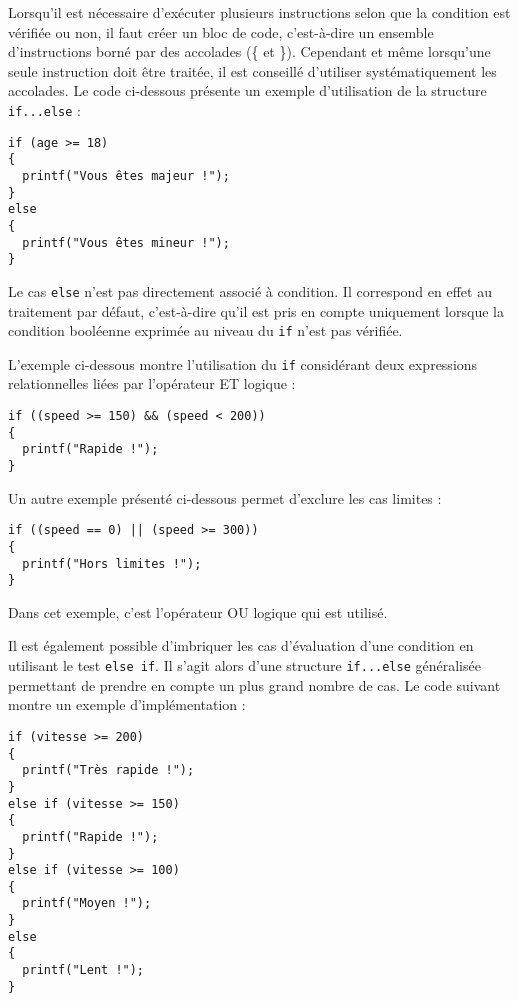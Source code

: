 \documentclass[DIV=calc,paper=a4,fontsize=11pt,twocolumn,halfparskip,parindent]{scrartcl} %
\begin{document}
Lorsqu’il est nécessaire d’exécuter plusieurs instructions selon que la condition est vérifiée ou non, il faut créer un bloc de code, c’est-à-dire un ensemble
d’instructions borné par des accolades (\{ et \}). Cependant et même lorsqu'une seule instruction doit être traitée, il est conseillé d’utiliser systématiquement
les accolades. Le code ci-dessous présente un exemple d’utilisation de la structure \texttt{if...else} :
\begin{lstlisting}[frame=single]
if (age >= 18)
{
  printf("Vous êtes majeur !");
}
else
{
  printf("Vous êtes mineur !");
}
\end{lstlisting}

Le cas \texttt{else} n’est pas directement associé à condition. Il correspond en effet au traitement par défaut, c’est-à-dire qu’il est pris en compte uniquement lorsque
la condition booléenne exprimée au niveau du \texttt{if} n’est pas vérifiée. 

L'exemple ci-dessous montre l'utilisation du \texttt{if} considérant deux expressions relationnelles liées par l'opérateur ET logique :
\begin{lstlisting}[frame=single]
if ((speed >= 150) && (speed < 200))
{
  printf("Rapide !");
}
\end{lstlisting}

Un autre exemple présenté ci-dessous permet d'exclure les cas limites :
\begin{lstlisting}[frame=single]
if ((speed == 0) || (speed >= 300))
{
  printf("Hors limites !");
}
\end{lstlisting}

Dans cet exemple, c'est l'opérateur OU logique qui est utilisé.

Il est également possible d’imbriquer les cas d’évaluation d’une condition en utilisant le test \texttt{else if}. Il s'agit alors d'une structure \texttt{if...else}
généralisée permettant de prendre en compte un plus grand nombre de cas. Le code suivant montre un exemple d’implémentation :
\begin{lstlisting}[frame=single]
if (vitesse >= 200)
{
  printf("Très rapide !");
}
else if (vitesse >= 150)
{
  printf("Rapide !");
}
else if (vitesse >= 100)
{
  printf("Moyen !");
}
else
{
  printf("Lent !");
}
\end{lstlisting}
\end{document}
